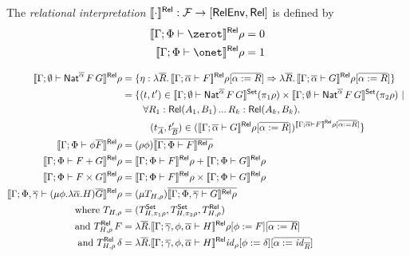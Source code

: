 \documentclass{lmcs}
\theoremstyle{plain}\newtheorem{satz}[thm]{Satz}
\newcommand{\F}{\mathcal{F}}
\newcommand{\set}{\mathsf{Set}}
\renewcommand{\id}{\mathit{id}}
\begin{document}
\begin{defi}\label{def:rel-sem}
The {\em relational interpretation} $\relsem{\cdot} : \F \to [\relenv,
 \rel]$ is defined by
\begin{align*}
  \relsem{\Gamma;\Phi \vdash \zerot}\rho &= 0\\
  \relsem{\Gamma;\Phi \vdash \onet}\rho &= 1\\
  \end{align*}

\vspace*{-0.5in}

\begin{align*}
  \relsem{\Gamma; \emptyset \vdash \Nat^{\ol{\alpha}} \,F\,G}\rho &= \{\eta
  : \lambda \ol{R}.\,\relsem{\Gamma; \ol{\alpha} \vdash
    F}\rho[\ol{\alpha := R}] \Rightarrow \lambda \ol{R}. \,\relsem{
    \Gamma; \ol{\alpha} \vdash G}\rho[\ol{\alpha := R}]\}\\
  &=
  \{(t,t') \in \setsem{\Gamma; \emptyset
    \vdash \Nat^{\ol{\alpha}}
    \,F\,G} (\pi_1 \rho) \times \setsem{ 
    \Gamma;\emptyset
    \vdash \Nat^{\ol{\alpha}} \,F\,G} (\pi_2
  \rho)~|~\\ 
  & \hspace{0.3in} \forall {R_1 : \rel(A_1,B_1)}\,...\,{R_k : \rel(A_k,B_k)}.\\
  & \hspace{0.4in} (t_{\ol{A}},t'_{\ol{B}}) \in
  (\relsem{\Gamma; \ol{\alpha} \vdash G}\rho[\ol{\alpha :=
      R}])^{\relsem{\Gamma;\ol{\alpha}\vdash F}\rho[\ol{\alpha := R}]} \}\\  
  \relsem{\Gamma;\Phi \vdash \phi \ol{F}}\rho &=
  (\rho\phi)\ol{\relsem{\Gamma;\Phi \vdash 
    F}\rho}\\
  \relsem{\Gamma;\Phi \vdash F+G}\rho &=
  \relsem{\Gamma;\Phi \vdash F}\rho +
  \relsem{\Gamma;\Phi \vdash G}\rho\\
  \relsem{\Gamma;\Phi \vdash F\times G}\rho &=
  \relsem{\Gamma;\Phi \vdash F}\rho \times
  \relsem{\Gamma;\Phi \vdash G}\rho\\  
   \relsem{\Gamma;\Phi,\ol\gamma \vdash (\mu \phi.\lambda
    \ol{\alpha}. H)\ol{G}}\rho
  &= (\mu T_{H,\rho})\ol{\relsem{\Gamma;\Phi,\ol\gamma \vdash
     G}\rho}\\
  \text{where }	T_{H,\rho}
    &= (T^\set_{H,\pi_1\rho}, T^\set_{H,\pi_2\rho}, T^\rel_{H,\rho}) \\
  \text{and } T^\rel_{H,\rho}\,F
    &= \lambda \ol{R}. \relsem{
      \Gamma;\ol\gamma,\phi,\ol{\alpha} \vdash H}\rho[\phi :=
    F][\ol{\alpha := R}]\\
  \text{and } T^\rel_{H,\rho}\,\delta
    &= \lambda \ol{R}. \relsem{
      \Gamma;\ol\gamma,\phi,\ol{\alpha} \vdash H}\id_\rho[\phi :=
    \delta][\ol{\alpha := \id_{\ol{R}}}]
\end{align*}
\end{defi}
\end{document}
